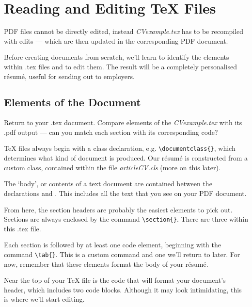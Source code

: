 \section{Reading and Editing TeX Files}
PDF files cannot be directly edited, instead \emph{CVexample.tex} has to be recompiled with edits --- which are then updated in the corresponding PDF document. \par

Before creating documents from scratch, we'll learn to identify the elements within .tex files and to edit them. The result will be a completely personalised r\'esum\'e, useful for sending out to employers. \par

\subsection{Elements of the Document}
\begin{instrct}
Return to your .tex document. Compare elements of the \emph{CVexample.tex} with its .pdf output --- can you match each section with its corresponding code?
\end{instrct}

TeX files always begin with a class declaration, e.g. \lstinline|\documentclass{}|, which determines what kind of document is produced. Our r\'esum\'e is constructed from a custom class, contained within the file \emph{articleCV.cls} (more on this later). \par

The `body', or contents of a text document are contained between the declarations \lstinline|| and \lstinline||. This includes all the text that you see on your PDF document. \par

From here, the section headers are probably the easiest elements to pick out. Sections are always enclosed by the command \lstinline|\section{}|. There are three within this .tex file. \par

Each section is followed by at least one code element, beginning with the command \lstinline|\tab{}|. This is a custom command and one we'll return to later. For now, remember that these elements format the body of your r\'esum\'e. \par

Near the top of your TeX file is the code that will format your document's header, which includes two code blocks. Although it may look intimidating, this is where we'll start editing. \par

